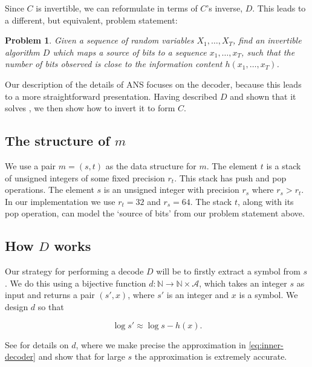 \documentclass{article}
\newtheorem{problem}{Problem}
\begin{document}
Since $C$ is invertible, we can reformulate  in terms of
$C$'s inverse, $D$. This leads to a different, but equivalent, problem
statement:

\begin{problem}\label{prob:alt}
        Given a sequence of random variables $X_1, \ldots, X_T$, find an
        invertible algorithm $D$ which maps a source of bits to a sequence
        $x_1, \ldots, x_T$, such that the number of bits observed is close to
        the information content $h(x_1, \ldots, x_T)$.
\end{problem}

Our description of the details of ANS focuses on the decoder, because this
leads to a more straightforward presentation. Having described $D$ and shown
that it solves , we then show how to invert it to form $C$.


\subsection{The structure of $m$}
We use a pair $m = (s, t)$ as the data structure for $m$. The element $t$ is a
stack of unsigned integers of some fixed precision $r_t$. This stack has push
and pop operations. The element $s$ is an unsigned integer with precision $r_s$
where $r_s > r_t$. In our implementation we use $r_t = 32$ and $r_s = 64$. The
stack $t$, along with its pop operation, can model the `source of bits' from
our problem statement above.

\subsection{How $D$ works}
Our strategy for performing a decode $D$ will be to firstly extract a symbol
from $s$. We do this using a bijective function $d:\mathbb N\rightarrow\mathbb
N\times\mathcal{A}$, which takes an integer $s$ as input and returns a pair
$(s', x)$, where $s'$ is an integer and $x$ is a symbol. We design $d$ so that

\begin{equation}\label{eq:inner-decoder}
\log s' \approx \log s - h(x).
\end{equation}

See  for details on $d$, where we make precise the
approximation in \cref{eq:inner-decoder} and show that for large $s$ the
approximation is extremely accurate.
\end{document}
